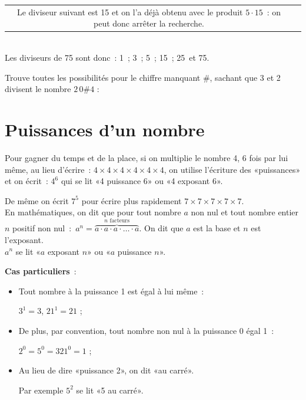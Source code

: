 \begin{methode*1}
\begin{exemple*1}
\begin{tabularx}{\textwidth}{c|X}
Le diviseur suivant est 15 et on l'a déjà obtenu avec le produit $5 \cdot 15$ : on peut donc arrêter la recherche. \\
\end{tabularx} \\[1em]
Les diviseurs de 75 sont donc : \textcolor{J1}{1} ; \textcolor{J1}{3} ; \textcolor{J1}{5} ; \textcolor{A1}{15} ; \textcolor{A1}{25} et \textcolor{A1}{75}.
 \end{exemple*1}



\exercice  
Trouve toutes les possibilités pour le chiffre manquant $\#$, sachant que 3 et 2 divisent le nombre $2\,0\#4$ :



 

 \end{methode*1}
 
 

\section{Puissances d'un nombre}

\begin{aconnaitre}
Pour gagner du temps et de la place, si on multiplie le nombre 4, 6 fois par lui même, au lieu d'écrire : $4 \times 4 \times 4 \times 4 \times 4 \times 4$, on utilise l'écriture des «puissances» et on écrit : $4^6$ qui se lit «4 puissance 6» ou «4 exposant 6».

De même on écrit $7^5$ pour écrire plus rapidement $7 \times 7 \times 7 \times 7 \times 7$. \\[1em]
En mathématiques, on dit que pour tout nombre $a$ non nul et tout nombre entier $n$ positif non nul : $a^n = \stackrel{n \text{ facteurs}}{\overbrace{a \cdot a \cdot a \cdot \ldots \cdot a}}$. On dit que $a$ est la base et $n$ est l'exposant. \\[1em]

$a^n$ se lit «$a$ exposant $n$» ou «$a$ puissance $n$».

\textbf{Cas particuliers} : 
\begin{itemize}
 \item Tout nombre à la puissance 1 est égal à lui même : 
 
 $3^1 = 3$, $21^1 = 21$ ;
 \item De plus, par convention, tout nombre non nul à la puissance 0 égal 1 : 
 
 $2^0 = 5^0 = 321^0 = 1$ ;
 \item Au lieu de dire «puissance 2», on dit «au carré». 
 
 Par exemple $5^2$ se lit «5 au carré».
 \end{itemize}
\end{aconnaitre}

